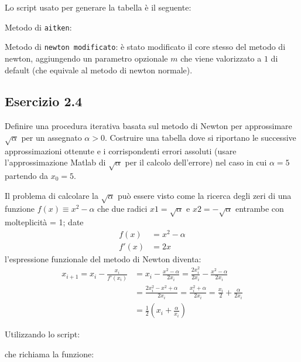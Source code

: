 Lo script usato per generare la tabella è il seguente:


Metodo di \lstinline{aitken}:


Metodo di \lstinline{newton modificato}: è stato modificato il core stesso del metodo di newton, aggiungendo un parametro opzionale $m$ che viene valorizzato a $1$ di default (che equivale al metodo di newton normale).



	\subsection{Esercizio 2.4}

Definire una procedura iterativa basata sul metodo di Newton per approssimare $\sqrt{\alpha}$ per un assegnato $\alpha > 0$. Costruire una tabella dove
si riportano le successive approssimazioni ottenute e i corrispondenti errori assoluti (usare l’approssimazione Matlab di $\sqrt{\alpha}$ per il calcolo dell'errore) nel caso in cui $\alpha = 5$ partendo da $x_0 = 5$.

Il problema di calcolare la $\sqrt{\alpha}$ può essere visto come la ricerca degli zeri di una funzione $f(x) \equiv x^2 - \alpha$ che due radici $x1=\sqrt{\alpha}$ e $x2= -\sqrt{\alpha}$ entrambe con molteplicità = 1; date
\begin{equation*}
	\begin{split}
		f(x) & = x^2 - \alpha \\
		f'(x) & = 2x
	\end{split}
\end{equation*}
l'espressione funzionale del metodo di Newton diventa:
\begin{equation*}
	\begin{split}
		x_{i+1} = x_i - \frac{x_i}{f'(x_i)} & = x_i - \frac{x^2-\alpha}{2x_i} = \frac{2x_i^2}{2x_i} - \frac{x^2-\alpha}{2x_i} \\
		& = \frac{2x_i^2 - x^2 + \alpha}{2x_i} = \frac{x_i^2+\alpha}{2x_i} = \frac{x_i}{2} + \frac{\alpha}{2x_i} \\
		& = \frac{1}{2}(x_i + \frac{\alpha}{x_i})
	\end{split}	
\end{equation*}

Utilizzando lo script:


che richiama la funzione:


